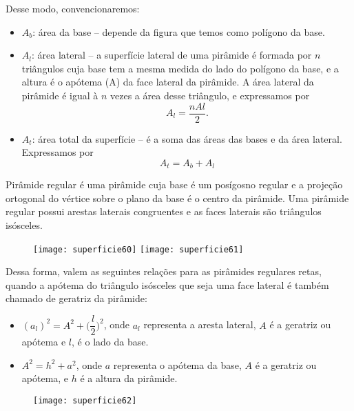 Desse modo, convencionaremos:
\begin{itemize}
  \item $A_b$: área da base -- depende da figura que temos como polígono da base.
  \item $A_l$: área lateral -- a superfície lateral de uma pirâmide é formada por $n$ triângulos cuja base tem a mesma medida do lado do polígono da base, e a altura é o apótema (A) da face lateral da pirâmide. A área lateral da pirâmide é igual à $n$ vezes a área desse triângulo, e expressamos por
  \begin{equation*}
  A_l=\frac{nAl}{2}.
  \end{equation*}
  \item $A_t$: área total da superfície -- é a soma das áreas das bases e da área lateral. Expressamos por 
  \begin{equation*}
  A_t=A_b+A_l
  \end{equation*}
\end{itemize}

Pirâmide regular é uma pirâmide cuja base é um posígosno regular e a projeção ortogonal do vértice sobre o plano da base é o centro da pirâmide. Uma pirâmide regular possui arestas laterais congruentes e as faces laterais são triângulos isósceles.

\begin{figure}[H]
\centering

\texttt{[image: superficie60]}\hspace{.5em}
\texttt{[image: superficie61]}
\end{figure}

Dessa forma, valem as seguintes relações para as pirâmides regulares retas, quando a apótema do triângulo isósceles que seja uma face lateral é também chamado de geratriz da pirâmide:
\begin{itemize}
  \item $(a_l)^2=A^2+\bigg(\dfrac{l}{2}\bigg)^2$, onde $a_l$ representa a aresta lateral, $A$ é a geratriz ou apótema e $l$, é o lado da base.
  \item $A^2=h^2+a^2$, onde $a$ representa o apótema da base, $A$ é a geratriz ou apótema, e $h$ é a altura da pirâmide.
\end{itemize}

\begin{figure}[H]
\centering

\texttt{[image: superficie62]}
\end{figure}

